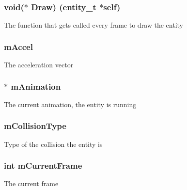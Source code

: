 \subsubsection[{\texorpdfstring{Draw}{Draw}}]{\setlength{\rightskip}{0pt plus 5cm}void($\ast$ Draw) ({\bf entity\+\_\+t} $\ast$self)}\hypertarget{structentity__s_a51719e3ab7c4f8dd260dea013021f53c}{}\label{structentity__s_a51719e3ab7c4f8dd260dea013021f53c}
The function that gets called every frame to draw the entity 
\subsubsection[{\texorpdfstring{m\+Accel}{mAccel}}]{ m\+Accel}\hypertarget{structentity__s_ae9f3b8e36df4503009ee071958f75b6c}{}\label{structentity__s_ae9f3b8e36df4503009ee071958f75b6c}
The acceleration vector 
\subsubsection[{\texorpdfstring{m\+Animation}{mAnimation}}]{$\ast$ m\+Animation}\hypertarget{structentity__s_ab8851adbf3f67db41bcdac86f698b197}{}\label{structentity__s_ab8851adbf3f67db41bcdac86f698b197}
The current animation, the entity is running 
\subsubsection[{\texorpdfstring{m\+Collision\+Type}{mCollisionType}}]{ m\+Collision\+Type}\hypertarget{structentity__s_afe71918d74f1053c28126544dce2f32b}{}\label{structentity__s_afe71918d74f1053c28126544dce2f32b}
Type of the collision the entity is 
\subsubsection[{\texorpdfstring{m\+Current\+Frame}{mCurrentFrame}}]{\setlength{\rightskip}{0pt plus 5cm}int m\+Current\+Frame}\hypertarget{structentity__s_a4bf029653a0ffc8ad5dfddd243aeff72}{}\label{structentity__s_a4bf029653a0ffc8ad5dfddd243aeff72}
The current frame 

